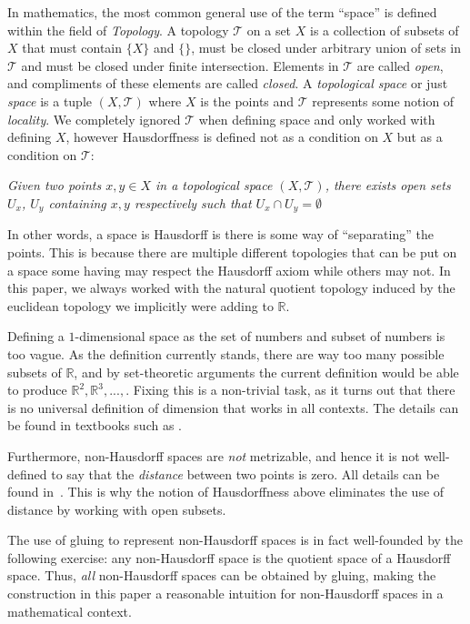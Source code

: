 \documentclass{article}
\newcommand{\R}{{\mathbb{R}}}
\newcommand{\CT}{{\mathcal{T}}}
\begin{document}
In mathematics, the most common general use of the term ``space'' is defined within the field of \emph{Topology}. A
topology $\CT$ on a set $X$ is a collection of subsets of $X$ that must contain $\{X\}$ and $\{\}$, must be
closed under arbitrary union of sets in $\CT$ and must be closed under finite intersection. Elements in $\CT$
are called \emph{open}, and compliments of these elements are called \emph{closed}. A \emph{topological space}
or just \emph{space} is a tuple $(X, \CT)$ where $X$ is the points and $\CT$ represents some notion of
\emph{locality}. We completely ignored $\CT$ when defining space and only worked with defining $X$, however
Hausdorffness is defined not as a condition on $X$ but as a condition on $\CT$:
\begin{center}
  \emph{Given two points $x,y \in X$ in a topological space $(X,\CT)$, there exists open sets $U_x$, $U_y$
  containing $x,y$ respectively such that $U_x\cap U_y = \emptyset$}
\end{center}
In other words, a space is Hausdorff is there is some way of ``separating'' the points. This is because there
are multiple different topologies that can be put on a space some having may respect the Hausdorff axiom while
others may not. In this paper, we always worked with the natural quotient topology induced by the euclidean topology we
implicitly were adding to $\R$.

Defining a $1$-dimensional space as the set of numbers and subset of numbers is too vague. As the definition
currently stands, there are way too many possible subsets of $\R$, and by set-theoretic arguments the current
definition would be able to produce $\R^2, \R^3, ..., $. Fixing this is a non-trivial task, as it turns out
that there is no universal definition of dimension that works in all contexts. The details can be found in
textbooks such as \cite{NateTop}.

Furthermore, non-Hausdorff spaces are \emph{not} metrizable, and hence it is not well-defined to say that the
\emph{distance} between two points is zero. All details can be found in~\cite{NateTop}. This is why the notion
of Hausdorffness above eliminates the use of distance by working with open subsets.

The use of gluing to represent non-Hausdorff spaces is in fact well-founded by the following exercise: any
non-Hausdorff space is the quotient space of a Hausdorff space. Thus, \emph{all} non-Hausdorff spaces can be
obtained by gluing, making the construction in this paper a reasonable intuition for non-Hausdorff spaces in
a mathematical context.


\printbibliography
\end{document}
